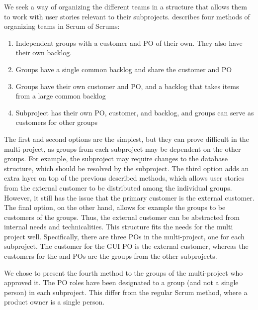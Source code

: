 \begin{description}
  We seek a way of organizing the different teams in a structure that allows them to work with user stories relevant to their subprojects. \textcite{bird_davies_2007} describes four methods of organizing teams in Scrum of Scrums:
  \begin{enumerate}
    \item Independent groups with a customer and PO of their own. They also have their own backlog.
    \item Groups have a single common backlog and share the customer and PO
    \item Groups have their own customer and PO, and a backlog that takes items from a large common backlog
    \item Subproject has their own PO, customer, and backlog, and groups can serve as customers for other groups
  \end{enumerate}
  The first and second options are the simplest, but they can prove difficult in the multi-project, as groups from each subproject may be dependent on the other groups. For example, the \gui subproject may require changes to the database structure, which should be resolved by the \db subproject. The third option adds an extra layer on top of the previous described methods, which allows user stories from the external customer to be distributed among the individual groups. However, it still has the issue that the primary customer is the external customer. The final option, on the other hand, allows for example the \gui groups to be customers of the \bd groups. Thus, the external customer can be abstracted from internal needs and technicalities. This structure fits the needs for the multi project well. Specifically, there are three POs in the multi-project, one for each subproject. The customer for the GUI PO is the external customer, whereas the customers for the \db and \bd POs are the groups from the other subprojects. 
  
  We chose to present the fourth method to the groups of the multi-project who approved it. The PO roles have been designated to a group (and not a single person) in each subproject. This differ from the regular Scrum method, where a product owner is a single person.
  

\end{description}
